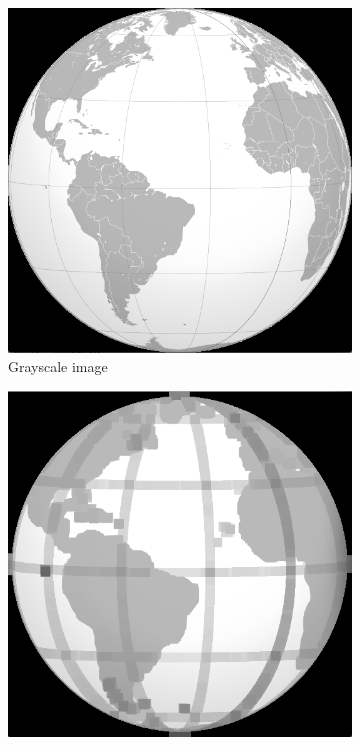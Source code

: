 \begin{figure}[!ht]
        \centering
        \begin{subfigure}[b]{0.3\textwidth}
                \includegraphics[scale = 0.2]{img/globe}
                \caption{Grayscale image}
        \end{subfigure}
		\quad
        \begin{subfigure}[b]{0.3\textwidth}
                \includegraphics[scale = 0.2]{img/erode}

\end{subfigure}
\end{figure}
